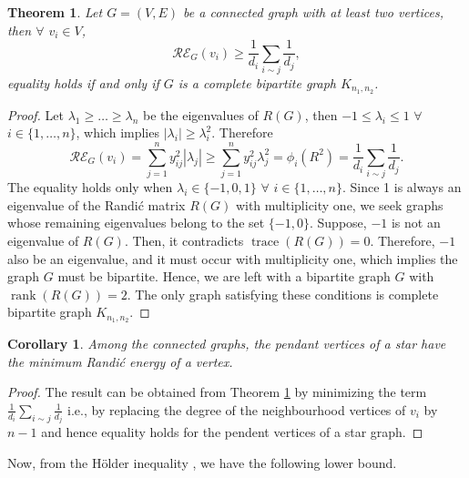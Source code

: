 \documentclass[10 pt]{article}
\newtheorem{theorem}{Theorem}[section]
\newtheorem{corollary}{Corollary}[section]
\numberwithin{equation}{section}
\newcommand{\rank}{\operatorname{rank}}
\newcommand{\trace}{\operatorname{trace}}
\begin{document}
\begin{theorem}\label{Randic vertex energy lower bound 1}
Let $G=(V,E)$ be a connected graph with at least two vertices, then $\forall$ $v_i\in V$,
$$\mathcal{RE}_G(v_i)\geq\frac{1}{d_i}\sum\limits_{i\sim j}\frac{1}{d_j},$$
equality holds if and only if $G$ is a complete bipartite graph $K_{n_1,n_2}$.
\end{theorem}
\begin{proof}
Let $\lambda_1\geq\ldots\geq\lambda_n$ be the eigenvalues of $R(G)$, then $-1\leq\lambda_i\leq 1$ $\forall$ $i\in \{1,\ldots,n\}$, which implies $|\lambda_i|\geq \lambda_i^2$. Therefore
$$\mathcal{RE}_G(v_i)=\sum\limits_{j=1}^ny^{2}_{ij}|\lambda_j|\geq \sum\limits_{j=1}^ny^{2}_{ij}\lambda_j^2=\phi_i(R^2)=\frac{1}{d_i}\sum\limits_{i\sim j}\frac{1}{d_j}. $$
The equality holds only when $\lambda_i\in \{-1,0,1\}$ $\forall$ $i\in \{1,\ldots,n\}$. Since 1 is always an eigenvalue of the Randi\'c matrix $R(G)$ with multiplicity one, we seek graphs whose remaining eigenvalues belong to the set $\{-1,0\}$. Suppose, $-1$ is not an eigenvalue of $R(G)$. Then, it contradicts $\trace(R(G))=0$. Therefore, $-1$ also be an eigenvalue, and it must occur with multiplicity one, which implies the graph $G$ must be bipartite. Hence, we are left with a bipartite graph $G$ with $\rank(R(G))=2$. The only graph satisfying these conditions is complete bipartite graph $K_{n_1,n_2}$.
\end{proof}

\begin{corollary}
Among the connected graphs, the pendant vertices of a star have the minimum Randi\'c energy of a vertex.
\end{corollary}
\begin{proof}
The result can be obtained from Theorem \ref{Randic vertex energy lower bound 1} by minimizing the term $\frac{1}{d_i}\sum\limits_{i\sim j}\frac{1}{d_j}$ i.e., by replacing the degree of the neighbourhood vertices of $v_i$ by $n-1$ and hence equality holds for the pendent vertices of a star graph.
\end{proof}


Now, from the H\"{o}lder inequality \cite{Bhatia1997}, we have the following lower bound.
\end{document}
